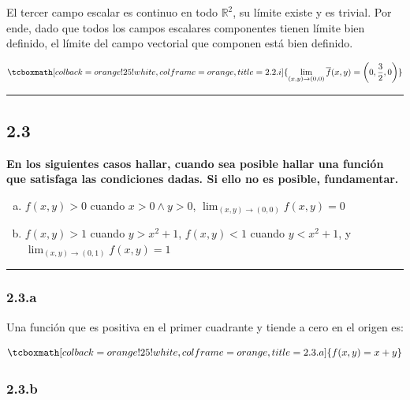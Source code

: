\documentclass{article}
\renewcommand{\Bbb}{\mathbb}
\begin{document}
El tercer campo escalar es continuo en todo $\Bbb R^2$, su límite existe y es trivial. Por ende, dado que todos los campos escalares componentes tienen límite bien definido, el límite del campo vectorial que componen está bien definido.

\begin{equation}
\tcboxmath[colback=orange!25!white,colframe=orange,title=2.2.i]
{ \lim_{(x,y) \rightarrow (0,0) } \overline{f}(x,y) = \left( 0, \frac{3}{2}, 0 \right) }
\end{equation}

\hrule
\vspace{10 pt}

\subsection*{2.3}
\label{subsec:2.3}

\textbf{En los siguientes casos hallar, cuando sea posible hallar una función que satisfaga las condiciones dadas. Si ello no es posible, fundamentar.} 

\begin{enumerate}[(a)]
\bfseries
\item $ f(x,y) > 0$ cuando $x > 0 \wedge y > 0$, $\lim_{(x,y) \rightarrow (0,0)} f(x,y) = 0$

\item $f(x,y) > 1$ cuando $y > x^2 + 1$, $f(x,y) < 1$ cuando $y < x^2 + 1$, y $\lim_{(x,y) \rightarrow (0,1)} f(x,y) = 1$
\end{enumerate}
\hrule

\subsubsection*{2.3.a}
\label{subsubsec:2.3.a}

Una función que es positiva en el primer cuadrante y tiende a cero en el origen es:

\begin{equation}
\tcboxmath[colback=orange!25!white,colframe=orange,title=2.3.a]
{ f(x,y) = x + y }
\end{equation}

\subsubsection*{2.3.b}
\label{subsubsec:2.3.b}
\end{document}
